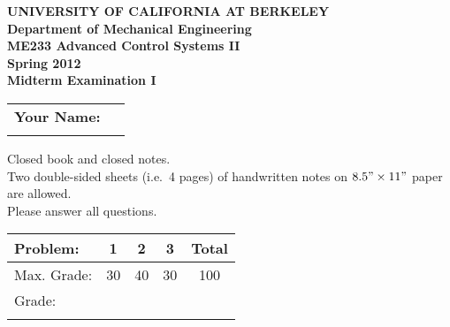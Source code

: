 \documentclass[letterpaper,12pt]{article}
\begin{document}
\begin{center}
    {\bf UNIVERSITY OF CALIFORNIA AT BERKELEY}\\
    {\bf Department of Mechanical Engineering}\\
    {\bf ME233  Advanced Control Systems II\\
    Spring 2012} \\ \vspace{2ex}
    {\Large \bf{ Midterm Examination I }}
\end{center}

\begin{tabular}{|l l|}
    \hline
    {\bf Your Name:} & \hspace{4in}$\:$\\
    $\:$ & $\:$\\
    \hline
\end{tabular}

$\:$\\

\noindent
Closed book and closed notes. \\
Two double-sided sheets (i.e.\ 4 pages) of handwritten notes on $8.5" \times 11"$ paper are allowed. \\
Please answer all questions.\\

\begin{tabular}{|l | c | c | c| c |  }
    \hline
    Problem: & 1 & 2 & 3   &Total \\ \hline
    Max. Grade: & 30 & 40 & 30 & 100 \\ \hline
    Grade: & \hspace{.5in} &\hspace{.5in} &\hspace{.5in}  &\hspace{.5in}  \\
    & & & & \\
    \hline
\end{tabular}



\newpage $\,$ \newpage

\newpage $\,$ \newpage

\newpage $\,$ \newpage
\end{document}
